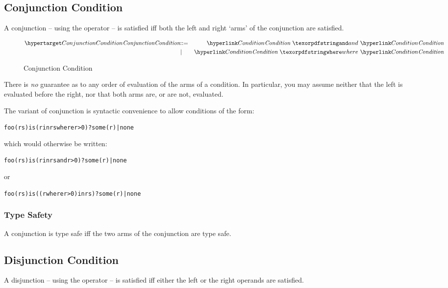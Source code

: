 \subsection{Conjunction Condition}
A conjunction -- using the  operator -- is satisfied iff both the left and right `arms' of the conjunction are satisfied.

\begin{figure}[htbp]
\begin{eqnarray*}
\ntDef{ConjunctionCondition}&\arrow&\ntRef{Condition}\ \q{and}\ \ntRef{Condition}\\
&\choice&\ntRef{Condition}\ \q{where}\ \ntRef{Condition}\\
\end{eqnarray*}
\caption{Conjunction Condition}
\label{conjunctionConditionFormFig}
\end{figure}

\begin{aside}
There is \emph{no} guarantee as to any order of evaluation of the arms of a condition. In particular, you may assume neither that the left is evaluated before the right, nor that both arms are, or are not, evaluated.
\end{aside}

\begin{aside}
The  variant of conjunction is syntactic convenience to allow conditions of the form:
\begin{alltt}
foo(rs) is (r in rs where r > 0) ? some(r) | none
\end{alltt}
which would otherwise be written:
\begin{alltt}
foo(rs) is (r in rs and r > 0) ? some(r) | none
\end{alltt}
or
\begin{alltt}
foo(rs) is ((r where r > 0) in rs) ? some(r) | none
\end{alltt}
\end{aside}

\subsubsection{Type Safety}
A conjunction is type safe iff the two arms of the conjunction are type safe.
\begin{prooftree}
\end{prooftree}

\subsection{Disjunction Condition}
\label{disjunction}
A disjunction -- using the  operator -- is satisfied iff either the left or the right operands are satisfied.

